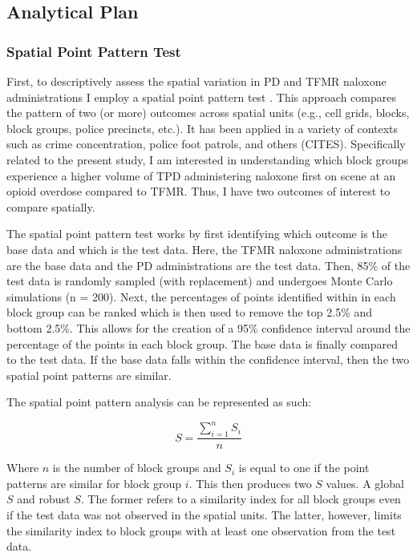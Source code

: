 \subsection{Analytical Plan}
\subsubsection{Spatial Point Pattern Test}

First, to descriptively assess the spatial variation in PD and TFMR naloxone administrations I employ a spatial point pattern test \parencite{andresen_testing_2009}. This approach compares the pattern of two (or more) outcomes across spatial units (e.g., cell grids, blocks, block groups, police precincts, etc.). It has been applied in a variety of contexts such as crime concentration, police foot patrols, and others (CITES). Specifically related to the present study, I am interested in understanding which block groups experience a higher volume of TPD administering naloxone first on scene at an opioid overdose compared to TFMR. Thus, I have two outcomes of interest to compare spatially. 

The spatial point pattern test works by first identifying which outcome is the base data and which is the test data. Here, the TFMR naloxone administrations are the base data and the PD administrations are the test data. Then, 85\% of the test data is randomly sampled (with replacement) and undergoes Monte Carlo simulations (n = 200). Next, the percentages of points identified within in each block group can be ranked which is then used to remove the top 2.5\% and bottom 2.5\%. This allows for the creation of a 95\% confidence interval around the percentage of the points in each block group. The base data is finally compared to the test data. If the base data falls within the confidence interval, then the two spatial point patterns are similar.

The spatial point pattern analysis can be represented as such:

\[
    S = \frac{\sum_{i=1}^n S_i}{n}
\]

\noindent Where \(n\) is the number of block groups and \(S_i\) is equal to one if the point patterns are similar for block group \(i\). This then produces two \(S\) values. A global \(S\) and robust \(S\). The former refers to a similarity index for all block groups even if the test data was not observed in the spatial units. The latter, however, limits the similarity index to block groups with at least one observation from the test data. 


